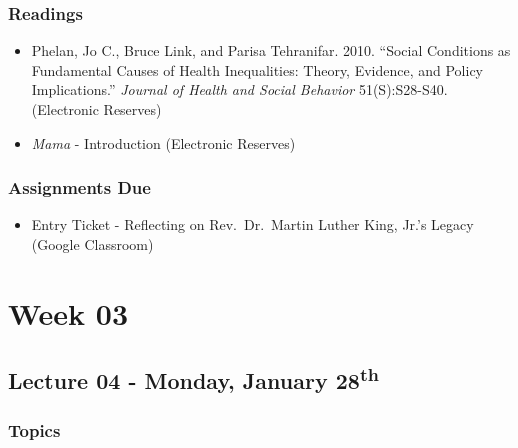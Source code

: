 \documentclass[]{book}
\providecommand{\tightlist}{%
  \setlength{\itemsep}{0pt}\setlength{\parskip}{0pt}}
\begin{document}
\hypertarget{readings-3}{%
\subsubsection*{Readings}\label{readings-3}}

\begin{itemize}
\tightlist
\item
  Phelan, Jo C., Bruce Link, and Parisa Tehranifar. 2010. ``Social Conditions as Fundamental Causes of Health Inequalities: Theory, Evidence, and Policy Implications.'' \emph{Journal of Health and Social Behavior} 51(S):S28-S40. (Electronic Reserves)
\item
  \emph{Mama} - Introduction (Electronic Reserves)
\end{itemize}

\hypertarget{assignments-due-1}{%
\subsubsection*{Assignments Due}\label{assignments-due-1}}

\begin{itemize}
\tightlist
\item
  Entry Ticket - Reflecting on Rev.~Dr.~Martin Luther King, Jr.'s Legacy (Google Classroom)
\end{itemize}

\hypertarget{week-03}{%
\section*{Week 03}\label{week-03}}

\hypertarget{lecture-04---monday-january-28th}{%
\subsection*{\texorpdfstring{Lecture 04 - Monday, January 28\textsuperscript{th}}{Lecture 04 - Monday, January 28th}}\label{lecture-04---monday-january-28th}}

\hypertarget{topics-4}{%
\subsubsection*{Topics}\label{topics-4}}
\end{document}
